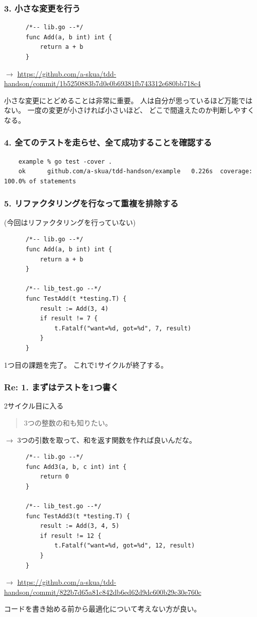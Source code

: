 \documentclass[aspectratio=169]{beamer}
\begin{document}
\begin{frame}[fragile]\frametitle{3. 小さな変更を行う}
  {
    \scriptsize
    \begin{verbatim}
      /*-- lib.go --*/
      func Add(a, b int) int {
          return a + b
      }
    \end{verbatim}

    $\rightarrow$
    \url{https://github.com/a-skua/tdd-handson/commit/1b5250883b7d0e0b69381fb743312e680bb718c4}
  }

  小さな変更にとどめることは非常に重要。
  人は自分が思っているほど万能ではない。
  一度の変更が小さければ小さいほど、
  どこで間違えたのか判断しやすくなる。
\end{frame}

\begin{frame}[fragile]\frametitle{4. 全てのテストを走らせ、全て成功することを確認する}
  \scriptsize
  \begin{verbatim}
    example % go test -cover .
    ok  	github.com/a-skua/tdd-handson/example	0.226s	coverage: 100.0% of statements
  \end{verbatim}
\end{frame}

\begin{frame}[fragile]\frametitle{5. リファクタリングを行なって重複を排除する}
  {\small (今回はリファクタリングを行っていない)}
  {
    \scriptsize
    \begin{verbatim}
      /*-- lib.go --*/
      func Add(a, b int) int {
          return a + b
      }

      /*-- lib_test.go --*/
      func TestAdd(t *testing.T) {
          result := Add(3, 4)
          if result != 7 {
              t.Fatalf("want=%d, got=%d", 7, result)
          }
      }
    \end{verbatim}
  }
  1つ目の課題を完了。
  これで1サイクルが終了する。
\end{frame}

\begin{frame}[fragile]\frametitle{Re: 1. まずはテストを1つ書く}
  2サイクル目に入る

  \begin{quote}
    \color{blue}
    3つの整数の和も知りたい。
  \end{quote}
  $\rightarrow$ 3つの引数を取って、和を返す関数を作れば良いんだな。

  {
    \scriptsize
    \begin{verbatim}
      /*-- lib.go --*/
      func Add3(a, b, c int) int {
          return 0
      }

      /*-- lib_test.go --*/
      func TestAdd3(t *testing.T) {
          result := Add(3, 4, 5)
          if result != 12 {
              t.Fatalf("want=%d, got=%d", 12, result)
          }
      }
    \end{verbatim}

    $\rightarrow$
    \url{https://github.com/a-skua/tdd-handson/commit/822b7d65a81c842db6ed62d9dc600b29c30e760c}
  }

  コードを書き始める前から最適化について考えない方が良い。
\end{frame}
\end{document}

